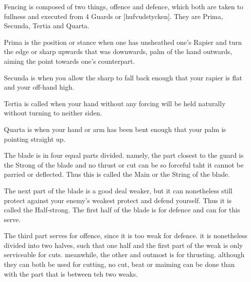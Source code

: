 \newpage


\newpage



Fencing is composed of two things, offence and defence, which both are
taken to fullness and executed from 4 Guards or [hufvudstycken]. They
are Prima, Secunda, Tertia and Quarta.

Prima is the position or stance when one has unsheathed one's Rapier
and turn the edge or sharp upwards that was downwards, palm of the
hand outwards, aiming the point towards one's counterpart.

Secunda is when you allow the sharp to fall back enough that your
rapier is flat and your off-hand high.

Tertia is called when your hand without any forcing will be held
naturally without turning to neither siden.

Quarta is when your hand or arm has been bent enough that your palm is
pointing straight up.


The blade is in four equal parts divided. namely, the part closest to
the guard is the Strong of the blade and no thrust or cut can be so
forceful taht it cannot be parried or deflected. Thus this is called
the Main or the String of the blade.

The next part of the blade is a good deal weaker, but it can
nonetheless still protect against your enemy's weakest protect and
defend yourself. Thus it is called the Half-strong. The first half of
the blade is for defence and can for this serve.

The third part serves for offence, since it is too weak for
defence. it is nonetheless divided into two halves, such that one half
and the first part of the weak is only serviceable for
cuts. meanwhile, the other and outmost is for thrusting. although they
can both be used for cutting, no cut, beat or maiming can be done than
with the part that is between teh two weaks.
